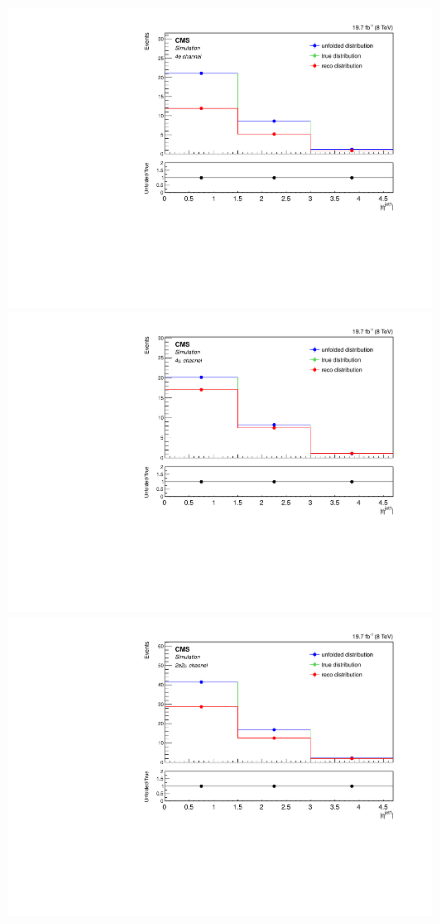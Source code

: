 \begin{figure}[hbtp]
  \begin{center}
    \includegraphics[width=0.8\cmsFigWidth]{Figures/Unfolding/MCTests/EtaJet1_ZZTo4e_MadMatrix_MadDistr_FullSample_fr}     
    \includegraphics[width=0.8\cmsFigWidth]{Figures/Unfolding/MCTests/EtaJet1_ZZTo4m_MadMatrix_MadDistr_FullSample_fr}     
    \includegraphics[width=0.8\cmsFigWidth]{Figures/Unfolding/MCTests/EtaJet1_ZZTo2e2m_MadMatrix_MadDistr_FullSample_fr}

\end{center}
\end{figure}
